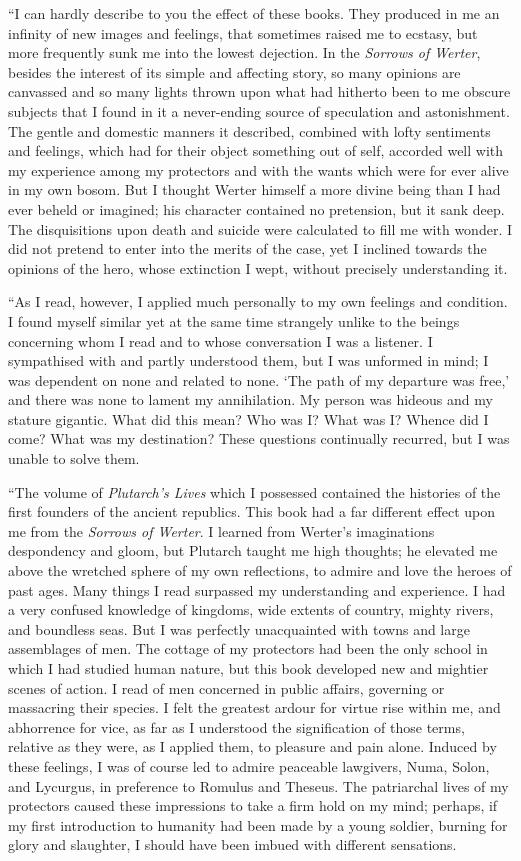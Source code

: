 \documentclass[12pt,openright]{book}
\begin{document}
“I can hardly describe to you the effect of these books. They produced in me an infinity of new images and feelings, that sometimes raised me to ecstasy, but more frequently sunk me into the lowest dejection. In the \textit{Sorrows of Werter}, besides the interest of its simple and affecting story, so many opinions are canvassed and so many lights thrown upon what had hitherto been to me obscure subjects that I found in it a never-ending source of speculation and astonishment. The gentle and domestic manners it described, combined with lofty sentiments and feelings, which had for their object something out of self, accorded well with my experience among my protectors and with the wants which were for ever alive in my own bosom. But I thought Werter himself a more divine being than I had ever beheld or imagined; his character contained no pretension, but it sank deep. The disquisitions upon death and suicide were calculated to fill me with wonder. I did not pretend to enter into the merits of the case, yet I inclined towards the opinions of the hero, whose extinction I wept, without precisely understanding it.

“As I read, however, I applied much personally to my own feelings and condition. I found myself similar yet at the same time strangely unlike to the beings concerning whom I read and to whose conversation I was a listener. I sympathised with and partly understood them, but I was unformed in mind; I was dependent on none and related to none. ‘The path of my departure was free,’ and there was none to lament my annihilation. My person was hideous and my stature gigantic. What did this mean? Who was I? What was I? Whence did I come? What was my destination? These questions continually recurred, but I was unable to solve them.

“The volume of \textit{Plutarch’s Lives} which I possessed contained the histories of the first founders of the ancient republics. This book had a far different effect upon me from the \textit{Sorrows of Werter}. I learned from Werter’s imaginations despondency and gloom, but Plutarch taught me high thoughts; he elevated me above the wretched sphere of my own reflections, to admire and love the heroes of past ages. Many things I read surpassed my understanding and experience. I had a very confused knowledge of kingdoms, wide extents of country, mighty rivers, and boundless seas. But I was perfectly unacquainted with towns and large assemblages of men. The cottage of my protectors had been the only school in which I had studied human nature, but this book developed new and mightier scenes of action. I read of men concerned in public affairs, governing or massacring their species. I felt the greatest ardour for virtue rise within me, and abhorrence for vice, as far as I understood the signification of those terms, relative as they were, as I applied them, to pleasure and pain alone. Induced by these feelings, I was of course led to admire peaceable lawgivers, Numa, Solon, and Lycurgus, in preference to Romulus and Theseus. The patriarchal lives of my protectors caused these impressions to take a firm hold on my mind; perhaps, if my first introduction to humanity had been made by a young soldier, burning for glory and slaughter, I should have been imbued with different sensations.
\end{document}
